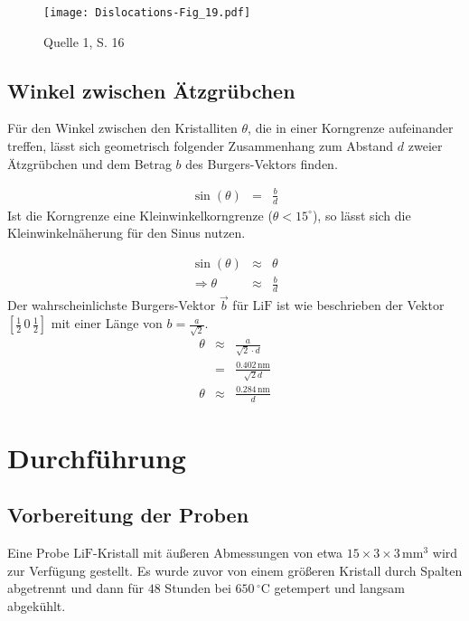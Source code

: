\documentclass[12pt,a4paper]{scrartcl}
\numberwithin{equation}{section} %
\renewcommand{\[}{} %
\renewcommand{\]}{\noindent} %
\begin{document}
\begin{figure}
\centering
\texttt{[image: Dislocations-Fig\_19.pdf]}
\caption{Quelle 1, S. 16}
\end{figure}

\hypertarget{winkel-zwischen-uxe4tzgruxfcbchen}{%
\subsection{Winkel zwischen
Ätzgrübchen}\label{winkel-zwischen-uxe4tzgruxfcbchen}}

Für den Winkel zwischen den Kristalliten \(\theta\), die in einer
Korngrenze aufeinander treffen, lässt sich geometrisch folgender
Zusammenhang zum Abstand \(d\) zweier Ätzgrübchen und dem Betrag \(b\)
des Burgers-Vektors finden.

\[
\begin{eqnarray}
    \sin(\theta) &=& \frac{b}{d}
\end{eqnarray}
\] Ist die Korngrenze eine Kleinwinkelkorngrenze
(\(\theta < 15^\circ\)), so lässt sich die Kleinwinkelnäherung für den
Sinus nutzen.

\[
\begin{eqnarray}
    \sin(\theta) &\approx& \theta \\
    \Rightarrow \theta &\approx& \frac{b}{d}
\end{eqnarray}
\] Der wahrscheinlichste Burgers-Vektor \(\vec{b}\) für \(\mathrm{LiF}\)
ist wie beschrieben der Vektor \([\frac{1}{2}\,0\,\frac{1}{2}]\) mit
einer Länge von \(b = \frac{a}{\sqrt{2}}\). \[
\begin{eqnarray}
    \theta &\approx& \frac{a}{\sqrt{2} \cdot d} \\
        &=& \frac{0.402\,\mathrm{nm}}{\sqrt{2} d}\\
    \theta &\approx& \frac{0.284\,\mathrm{nm}}{d} \label{theta}
\end{eqnarray}
\]

\hypertarget{durchfuxfchrung}{%
\section{Durchführung}\label{durchfuxfchrung}}

\hypertarget{vorbereitung-der-proben}{%
\subsection{Vorbereitung der Proben}\label{vorbereitung-der-proben}}

Eine Probe \(\mathrm{LiF}\)-Kristall mit äußeren Abmessungen von etwa
\(15 \times 3 \times 3 \,\mathrm{mm^3}\) wird zur Verfügung gestellt. Es
wurde zuvor von einem größeren Kristall durch Spalten abgetrennt und
dann für \(48\) Stunden bei \(650\,^\circ\mathrm C\) getempert und
langsam abgekühlt.
\end{document}
